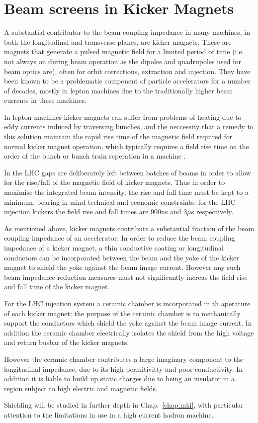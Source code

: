 \section{Beam screens in Kicker Magnets}
\label{sec:beam_screens}

A substantial contributor to the beam coupling impedance in many machines, in both the longitudinal and transverse planes, are kicker magnets. These are magnets that generate a pulsed magnetic field for a limited period of time (i.e. not always on during beam operation as the dipoles and quadrupoles used for beam optics are), often for orbit corrections, extraction and injection. They have been known to be a problematic component of particle accelerators for a number of decades, mostly in lepton machines due to the traditionally higher beam currents in these machines.

In lepton machines kicker magnets can suffer from problems of heating due to eddy currents induced by traversing bunches, and the neccessity that a remedy to this solution maintain the rapid rise time of the magnetic field required for normal kicker magnet operation, which typically requires a field rise time on the order of the bunch or bunch train seperation in a machine \cite{Caspers:ThinCondLayers}. 

In the LHC gaps are deliberately left between batches of beams in order to allow for the rise/fall of the magnetic field of kicker magnets. Thus in order to maximise the integrated beam intensity, the rise and fall time must be kept to a minimum, bearing in mind technical and economic constraints: for the LHC injection kickers the field rise and fall times are 900ns and 3$\mu$s respectively.

As mentioned above, kicker magnets contribute a substantial fraction of the beam coupling impedance of an accelerator. In order to reduce the beam coupling impedance of a kicker magnet, a thin conductive coating or longitudinal conductors can be incorporated between the beam and the yoke of the kicker magnet to shield the yoke against the beam image current. However any such beam impedance reduction measures must not significantly increas the field rise and fall time of the kicker magnet.

For the LHC injection system a ceramic chamber is incorporated in th aperature of each kicker magnet: the purpose of the ceramic chamber is to mechanically support the conductors which shield the yoke against the beam image current. In addition the ceramic chamber electrically isolates the shield from the high voltage and return busbar of the kicker magnets.

However the ceramic chamber contributes a large imaginary component to the longitudinal impedance, due to its high permitivitty and poor conductivity. In addition it is liable to build up static charges due to being an insulator in a region subject to high electric and magnetic fields.

Shielding will be studied in further depth in Chap.~\ref{chap:mki}, with particular attention to the limitations in use in a high current hadron machine.
